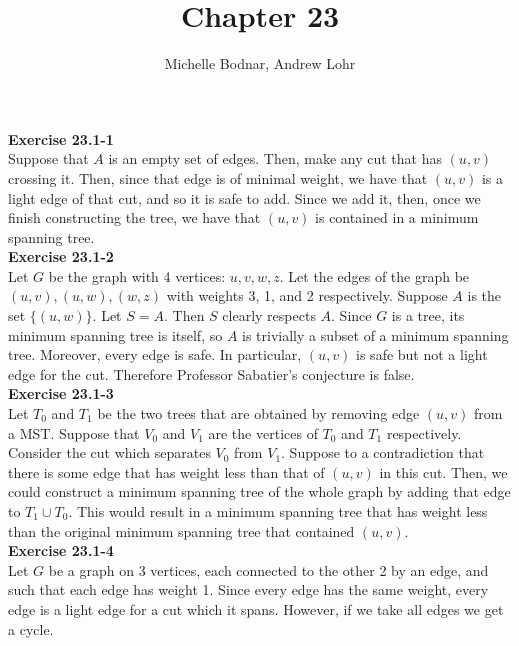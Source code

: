 \documentclass{article}
\title{Chapter 23}
\author{Michelle Bodnar, Andrew Lohr}
\begin{document}
\maketitle
\noindent\textbf{Exercise 23.1-1}\\

Suppose that $A$ is an empty set of edges. Then, make any cut that has $(u,v)$ crossing it. Then, since that edge is of minimal weight, we have that $(u,v)$ is a light edge of that cut, and so it is safe to add. Since we add it, then, once we finish constructing the tree, we have that $(u,v)$ is contained in a minimum spanning tree.\\

\noindent\textbf{Exercise 23.1-2}\\

Let $G$ be the graph with 4 vertices: $u, v, w, z$.  Let the edges of the graph be $(u,v), (u,w), (w,z)$ with weights 3, 1, and 2 respectively.  Suppose $A$ is the set $\{(u,w)\}$.  Let $S = A$.  Then $S$ clearly respects $A$.  Since $G$ is a tree, its minimum spanning tree is itself, so $A$ is trivially a subset of a minimum spanning tree.  Moreover, every edge is safe.  In particular, $(u,v)$ is safe but not a light edge for the cut.  Therefore Professor Sabatier's conjecture is false. \\

\noindent\textbf{Exercise 23.1-3}\\

Let $T_0$ and $T_1$ be the two trees that are obtained by removing edge $(u,v)$ from a MST. Suppose that $V_0$ and $V_1$ are the vertices of $T_0$ and $T_1$ respectively. Consider the cut which separates $V_0$ from $V_1$. Suppose to a contradiction that there is some edge that has weight less than that of $(u,v)$ in this cut. Then, we could construct a minimum spanning tree of the whole graph by adding that edge to $T_1 \cup T_0$. This would result in a minimum spanning tree that has weight less than the original minimum spanning tree that contained $(u,v)$.\\

\noindent\textbf{Exercise 23.1-4}\\

Let $G$ be a graph on 3 vertices, each connected to the other 2 by an edge, and such that each edge has weight 1.  Since every edge has the same weight, every edge is a light edge for a cut which it spans. However, if we take all edges we get a cycle. \\
\end{document}
